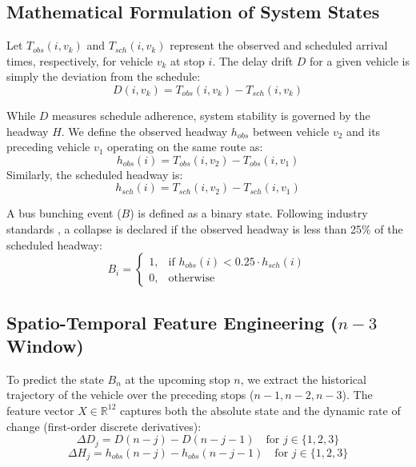 \documentclass[journal,twocolumn]{IEEEtran}
\begin{document}
\subsection{Mathematical Formulation of System States}
Let $T_{obs}(i, v_k)$ and $T_{sch}(i, v_k)$ represent the observed and scheduled arrival times, respectively, for vehicle $v_k$ at stop $i$. The delay drift $D$ for a given vehicle is simply the deviation from the schedule:
\begin{equation}
	D(i, v_k) = T_{obs}(i, v_k) - T_{sch}(i, v_k)
\end{equation}

While $D$ measures schedule adherence, system stability is governed by the headway $H$. We define the observed headway $h_{obs}$ between vehicle $v_2$ and its preceding vehicle $v_1$ operating on the same route as:
\begin{equation}
	h_{obs}(i) = T_{obs}(i, v_2) - T_{obs}(i, v_1)
\end{equation}
Similarly, the scheduled headway is:
\begin{equation}
	h_{sch}(i) = T_{sch}(i, v_2) - T_{sch}(i, v_1)
\end{equation}

A bus bunching event ($B$) is defined as a binary state. Following industry standards \cite{1, 10}, a collapse is declared if the observed headway is less than 25\% of the scheduled headway:
\begin{equation}
	B_i =
	\begin{cases}
		1, & \text{if } h_{obs}(i) < 0.25 \cdot h_{sch}(i) \\
		0, & \text{otherwise}
	\end{cases}
\end{equation}

\subsection{Spatio-Temporal Feature Engineering ($n-3$ Window)}
To predict the state $B_n$ at the upcoming stop $n$, we extract the historical trajectory of the vehicle over the preceding stops ($n-1, n-2, n-3$). The feature vector $X \in \mathbb{R}^{12}$ captures both the absolute state and the dynamic rate of change (first-order discrete derivatives):
\begin{equation}
	\Delta D_j = D(n-j) - D(n-j-1) \quad \text{for } j \in \{1, 2, 3\}
\end{equation}
\begin{equation}
	\Delta H_j = h_{obs}(n-j) - h_{obs}(n-j-1) \quad \text{for } j \in \{1, 2, 3\}
\end{equation}
\end{document}

